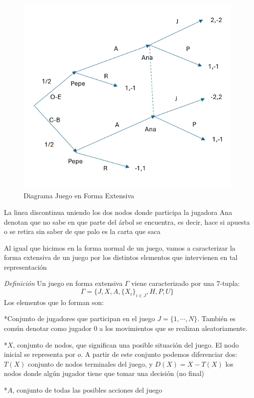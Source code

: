 \documentclass[12pt,a4paper,]{book}
\numberwithin{dummy}{section}
\theoremstyle{ocrenumbox}
\theoremstyle{blacknumex}
\theoremstyle{blacknumbox}
\theoremstyle{ocrenum}
\theoremstyle{ocrenum}
\begin{document}
\begin{figure}[H]

{\centering \includegraphics[width=0.8\linewidth]{forma_extensiva} 

}

\caption{\label{forma_extensiva}Diagrama Juego en Forma Extensiva}\label{fig:forma_extensiva}
\end{figure}

La linea discontinua uniendo los dos nodos donde participa la jugadora
Ana denotan que no sabe en que parte del árbol se encuentra, es decir,
hace si apuesta o se retira sin saber de que palo es la carta que saca

Al igual que hicimos en la forma normal de un juego, vamos a
caracterizar la forma extensiva de un juego por los distintos elementos
que intervienen en tal representación

\emph{Definición} Un juego en forma extensiva \(\Gamma\) viene
caracterizado por una 7-tupla:
\[\Gamma=\{J,X,A,\{X_i\}_{i \in J},H,P,U \}\] Los elementos que lo
forman son:

*Conjunto de jugadores que participan en el juego \(J=\{1,\cdots,N\}\).
También es común denotar como jugador 0 a los movimientos que se
realizan aleatoriamente.

*\(X\), conjunto de nodos, que significan una posible situación del
juego. El nodo inicial se representa por \(o\). A partir de este
conjunto podemos diferenciar dos: \(T(X)\) conjunto de nodos terminales
del juego, y \(D(X)=X-T(X)\) los nodos donde algún jugador tiene que
tomar una decisión (no final)

*\(A\), conjunto de todas las posibles acciones del juego
\end{document}
